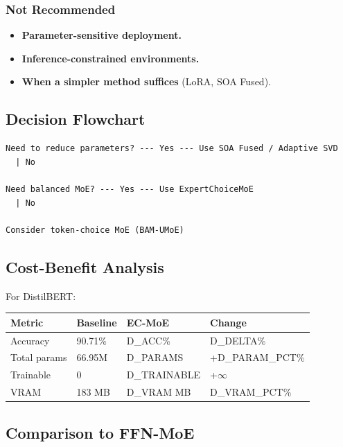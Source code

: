 \subsubsection{Not Recommended}
\begin{itemize}
\item \textbf{Parameter-sensitive deployment.}
\item \textbf{Inference-constrained environments.}
\item \textbf{When a simpler method suffices} (LoRA, SOA Fused).

\end{itemize}
\subsection{Decision Flowchart}

\begin{lstlisting}
Need to reduce parameters? --- Yes --- Use SOA Fused / Adaptive SVD
  | No
   
Need balanced MoE? --- Yes --- Use ExpertChoiceMoE
  | No
   
Consider token-choice MoE (BAM-UMoE)
\end{lstlisting}

\subsection{Cost-Benefit Analysis}

For DistilBERT:

\begin{table}[H]
\centering
\small
\begin{tabular}{llll}
\toprule
\textbf{Metric} & \textbf{Baseline} & \textbf{EC-MoE} & \textbf{Change} \\
\midrule
Accuracy & 90.71\% & {{D\_ACC}}\% & {{D\_DELTA}}\% \\
Total params & 66.95M & {{D\_PARAMS}} & +{{D\_PARAM\_PCT}}\% \\
Trainable & 0 & {{D\_TRAINABLE}} & +$\infty$ \\
VRAM & 183 MB & {{D\_VRAM}} MB & {{D\_VRAM\_PCT}}\% \\
\bottomrule
\end{tabular}
\end{table}

\subsection{Comparison to FFN-MoE}

